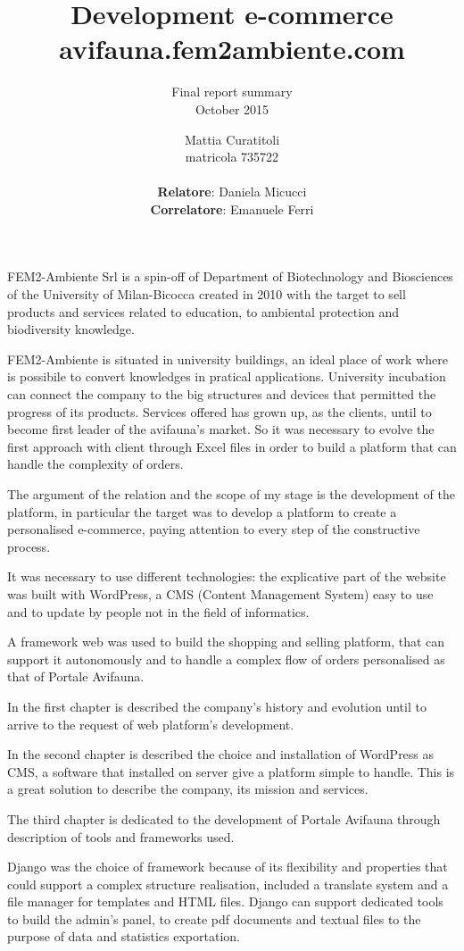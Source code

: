 \documentclass[12pt,a4paper]{scrartcl}
\author{
	Mattia Curatitoli \\ 
	matricola 735722 \\
	\\
	\textbf{Relatore}: Daniela Micucci \\
	\textbf{Correlatore}: Emanuele Ferri
}
\title{Development e-commerce avifauna.fem2ambiente.com}
\subtitle{
	Final report summary \\
 	October 2015
}
\date{}
\def \fem {FEM2-Ambiente}
\def \femsrl {FEM2-Ambiente Srl}
\def \wp {WordPress}
\begin{document}
\maketitle

{\femsrl} is a spin-off of Department of Biotechnology and Biosciences of the University of Milan-Bicocca created in 2010 with the target to sell products and services related to education, to ambiental protection and biodiversity knowledge. 

{\fem} is situated in university buildings, an ideal place of work where is possibile to convert knowledges in pratical applications. University incubation can connect the company to the big structures and devices that permitted the progress of its products. Services offered has grown up, as the clients, until to become first leader of the avifauna’s market. So it was necessary to evolve the first approach with client through Excel files in order to build a platform that can handle the complexity of orders.

The argument of the relation and the scope of my stage is the development of the platform, in particular the target was to develop a platform to create a personalised e-commerce, paying attention to every step of the constructive process.

It was necessary to use different technologies: the explicative part of the website was built with {\wp}, a CMS (Content Management System) easy to use and to update by people not in the field of informatics.

A framework web was used to build the shopping and selling platform, that can support it autonomously and to handle a complex flow of orders personalised as that of Portale Avifauna.

In the first chapter is described the company’s history and evolution until to arrive to the request of web platform’s development.

In the second chapter is described the choice and installation of {\wp} as CMS, a software that installed on server give a platform simple to handle. This is a great solution to describe the company, its mission and services.

The third chapter is dedicated to the development of Portale Avifauna through description of tools and frameworks used.

Django was the choice of framework because of its flexibility and properties that could support a complex structure realisation, included a translate system and a file manager for templates and HTML files. Django can support dedicated tools to build the admin’s panel, to create pdf documents and textual files to the purpose of data and statistics exportation.
\end{document}
